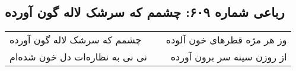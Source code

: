 \begin{center}
\section*{رباعی شماره ۶۰۹: چشمم که سرشک لاله گون آورده}
\label{sec:sh609}
\begin{longtable}{l p{0.5cm} r}
چشمم که سرشک لاله گون آورده
&&
وز هر مژه قطرهای خون آلوده
\\
نی نی به نظاره‌ات دل خون شده‌ام
&&
از روزن سینه سر برون آورده
\\
\end{longtable}
\end{center}
